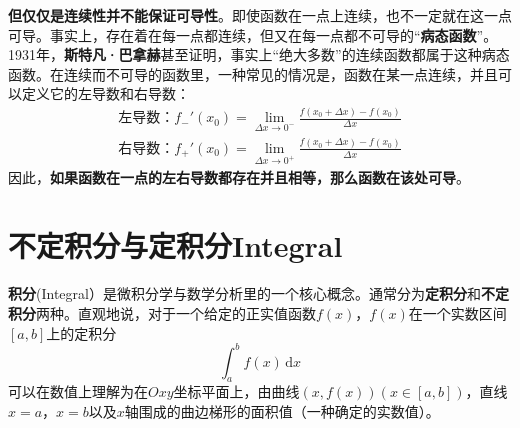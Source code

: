 \documentclass[UTF8]{ctexart}
\begin{document}
{\begin{question}
	\textbf{但仅仅是连续性并不能保证可导性}。即使函数在一点上连续，也不一定就在这一点可导。事实上，存在着在每一点都连续，但又在每一点都不可导的“\textbf{病态函数}”。1931年，\textbf{斯特凡·巴拿赫}甚至证明，事实上“绝大多数”的连续函数都属于这种病态函数。在连续而不可导的函数里，一种常见的情况是，函数在某一点连续，并且可以定义它的左导数和右导数：
\begin{eqnarray}
	\text{左导数：}f_{-}'(x_0)=\lim_{\Delta x \to 0^{-}}\frac{f(x_0+\Delta x)-f(x_0)}{\Delta x}\\
	\text{右导数：}f_{+}'(x_0)=\lim_{\Delta x \to 0^{+}}\frac{f(x_0+\Delta x)-f(x_0)}{\Delta x}
\end{eqnarray}
因此，\textbf{如果函数在一点的左右导数都存在并且相等，那么函数在该处可导}。
\end{question}

\section{不定积分与定积分Integral}
\textbf{积分}(Integral）是微积分学与数学分析里的一个核心概念。通常分为\textbf{定积分}和\textbf{不定积分}两种。直观地说，对于一个给定的正实值函数$f(x)$，$f(x)$在一个实数区间$[a,b]$上的定积分
\begin{equation}
	\int _{a}^{b}f(x)\,\mathrm {d} x
\end{equation}
可以在数值上理解为在$ \textstyle Oxy$坐标平面上，由曲线$(x,f(x))(x\in [a,b])$，直线$x=a\text{，}x=b$以及$x$轴围成的曲边梯形的面积值（一种确定的实数值）。

}
\end{document}
